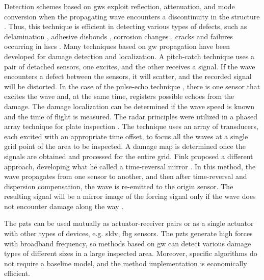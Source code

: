 \documentclass[11pt,a4paper,final]{report}
\begin{document}
Detection schemes based on \acp{gw} exploit reflection, attenuation, and mode conversion when the propagating wave encounters a discontinuity in the structure \cite{alleyne1992interaction}.
Thus, this technique is efficient in detecting various types of defects, such as delamination \cite{sohn2011delamination,tian2015delamination}, adhesive disbonds \cite{rucka2018damage,balasubramaniam2021ultrasonic}, corrosion changes \cite{alleyne1995long,lowe1998defect}, cracks \cite{tua2004detection,lu2006crack,zima2020detection} and failures occurring in \acp{hsc} \cite{mustapha2011assessment, sikdar2016guided, sikdar2016ultrasonic,radzienski2016assessment, yu2019core}.
Many techniques based on \ac{gw} propagation have been developed for damage detection and localization.
A pitch-catch technique \cite{ihn2008pitch, sikdar2017structural} uses a pair of detached sensors, one excites, and the other receives a signal.
If the wave encounters a defect between the sensors, it will scatter, and the recorded signal will be distorted.
In the case of the pulse-echo technique \cite{guo1993interaction, kudela2008damage}, there is one sensor that excites the wave and, at the same time, registers possible echoes from the damage.
The damage localization can be determined if the wave speed is known and the time of flight is measured.
The radar principles were utilized in a phased array technique for plate inspection \cite{giurgiutiu2004embedded, ostachowicz2008elastic, kudela2018structural}.
The technique uses an array of transducers, each excited with an appropriate time offset, to focus all the waves at a single grid point of the area to be inspected.
A damage map is determined once the signals are obtained and processed for the entire grid.
Fink proposed a different approach, developing what he called a time-reversal mirror \cite{fink1992time}.
In this method, the wave propagates from one sensor to another, and then after time-reversal and dispersion compensation, the wave is re-emitted to the origin sensor.
The resulting signal will be a mirror image of the forcing signal only if the wave does not encounter damage along the way \cite{park2007time, eremin2016analytically}.

The \acp{pzt} can be used mutually as actuator-receiver pairs or as a single actuator with other types of devices, e.g. \ac{sldv}, \ac{fbg} sensors.
The \acp{pzt} generate high forces with broadband frequency, so methods based on \ac{gw} can detect various damage types of different sizes in a large inspected area.
Moreover, specific algorithms do not require a baseline model, and the method implementation is economically efficient.
\end{document}
